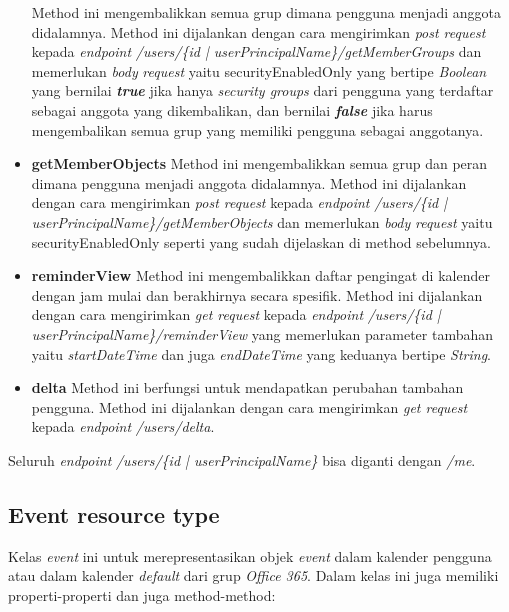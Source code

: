 \begin{itemize}
	Method ini mengembalikkan semua grup dimana pengguna menjadi anggota didalamnya. Method ini dijalankan dengan cara mengirimkan \textit{post request} kepada \textit{endpoint} \textit{/users/\{id | userPrincipalName\}/getMemberGroups} dan memerlukan \textit{body} \textit{request} yaitu securityEnabledOnly yang bertipe \textit{Boolean} yang bernilai \textit{\textbf{true}} jika hanya \textit{security groups} dari pengguna yang terdaftar sebagai anggota yang dikembalikan, dan bernilai \textit{\textbf{false}} jika harus mengembalikan semua grup yang memiliki pengguna sebagai anggotanya.
	\item \textbf{getMemberObjects}
	Method ini mengembalikkan semua grup dan peran dimana pengguna menjadi anggota didalamnya. Method ini dijalankan dengan cara mengirimkan \textit{post request} kepada \textit{endpoint} \textit{/users/\{id | userPrincipalName\}/getMemberObjects} dan memerlukan \textit{body} \textit{request} yaitu securityEnabledOnly seperti yang sudah dijelaskan di method sebelumnya.
	\item \textbf{reminderView}
	Method ini mengembalikkan daftar pengingat di kalender dengan jam mulai dan berakhirnya secara spesifik. Method ini dijalankan dengan cara mengirimkan \textit{get request} kepada \textit{endpoint} \textit{/users/\{id | userPrincipalName\}/reminderView} yang memerlukan parameter tambahan yaitu \textit{startDateTime} dan juga \textit{endDateTime} yang keduanya bertipe \textit{String}.
	\item \textbf{delta}
	Method ini berfungsi untuk mendapatkan perubahan tambahan pengguna. Method ini dijalankan dengan cara mengirimkan \textit{get request} kepada \textit{endpoint} \textit{/users/delta}.
\end{itemize}

Seluruh \textit{endpoint} \textit{/users/\{id | userPrincipalName\}} bisa diganti dengan \textit{/me}. 

\subsection{Event resource type}
Kelas \textit{event} ini untuk merepresentasikan objek \textit{event} dalam kalender pengguna atau dalam kalender \textit{default} dari grup \textit{Office 365}. Dalam kelas ini juga memiliki properti-properti dan juga method-method:
